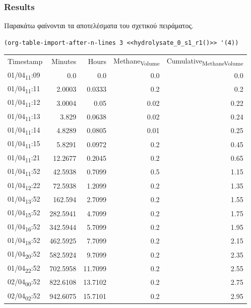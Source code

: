 \documentclass[11pt]{article}
\begin{document}
\subsubsection{Results}
\label{sec:org55bfa96}
Παρακάτω φαίνονται τα αποτελέσματα του σχετικού πειράματος.

\begin{verbatim}
(org-table-import-after-n-lines 3 <<hydrolysate_0_s1_r1()>> '(4))
\end{verbatim}

\begin{center}
\begin{tabular}{lrrrr}
Timestamp & Minutes & Hours & Methane\textsubscript{Volume} & Cumulative\textsubscript{Methane}\textsubscript{Volume}\\[0pt]
01/04\textsubscript{11}:09 & 0.0 & 0.0 & 0.0 & 0.0\\[0pt]
01/04\textsubscript{11}:11 & 2.0003 & 0.0333 & 0.2 & 0.2\\[0pt]
01/04\textsubscript{11}:12 & 3.0004 & 0.05 & 0.02 & 0.22\\[0pt]
01/04\textsubscript{11}:13 & 3.829 & 0.0638 & 0.02 & 0.24\\[0pt]
01/04\textsubscript{11}:14 & 4.8289 & 0.0805 & 0.01 & 0.25\\[0pt]
01/04\textsubscript{11}:15 & 5.8291 & 0.0972 & 0.2 & 0.45\\[0pt]
01/04\textsubscript{11}:21 & 12.2677 & 0.2045 & 0.2 & 0.65\\[0pt]
01/04\textsubscript{11}:52 & 42.5938 & 0.7099 & 0.5 & 1.15\\[0pt]
01/04\textsubscript{12}:22 & 72.5938 & 1.2099 & 0.2 & 1.35\\[0pt]
01/04\textsubscript{13}:52 & 162.594 & 2.7099 & 0.2 & 1.55\\[0pt]
01/04\textsubscript{15}:52 & 282.5941 & 4.7099 & 0.2 & 1.75\\[0pt]
01/04\textsubscript{16}:52 & 342.5944 & 5.7099 & 0.2 & 1.95\\[0pt]
01/04\textsubscript{18}:52 & 462.5925 & 7.7099 & 0.2 & 2.15\\[0pt]
01/04\textsubscript{20}:52 & 582.5924 & 9.7099 & 0.2 & 2.35\\[0pt]
01/04\textsubscript{22}:52 & 702.5958 & 11.7099 & 0.2 & 2.55\\[0pt]
02/04\textsubscript{00}:52 & 822.6108 & 13.7102 & 0.2 & 2.75\\[0pt]
02/04\textsubscript{02}:52 & 942.6075 & 15.7101 & 0.2 & 2.95\\[0pt]

\end{tabular}
\end{center}
\end{document}
